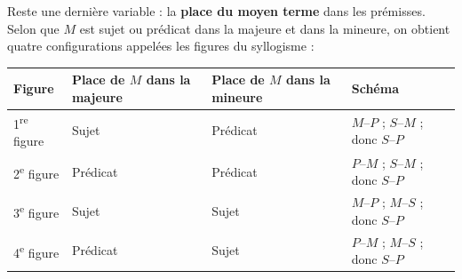 \documentclass[11pt]{article}
\newcommand{\cle}[1]{{\popxbold\color{popdark}#1}}
\begin{document}
Reste une dernière variable : la \textbf{place du moyen terme} dans les prémisses. Selon que $M$ est sujet ou prédicat dans la majeure et dans la mineure, on obtient quatre configurations appelées les \cle{figures} du syllogisme :

\begin{center}
\begin{tabularx}{\linewidth}{|l|X|X|X|}
\hline
\rowcolor{popblueL} \textbf{Figure} & \textbf{Place de $M$ dans la majeure} & \textbf{Place de $M$ dans la mineure} & \textbf{Schéma} \\
\hline
1\textsuperscript{re} figure & Sujet & Prédicat & $M$--$P$ ; $S$--$M$ ; donc $S$--$P$ \\
\hline
2\textsuperscript{e} figure & Prédicat & Prédicat & $P$--$M$ ; $S$--$M$ ; donc $S$--$P$ \\
\hline
3\textsuperscript{e} figure & Sujet & Sujet & $M$--$P$ ; $M$--$S$ ; donc $S$--$P$ \\
\hline
4\textsuperscript{e} figure & Prédicat & Sujet & $P$--$M$ ; $M$--$S$ ; donc $S$--$P$ \\
\hline
\end{tabularx}
\end{center}
\end{document}
